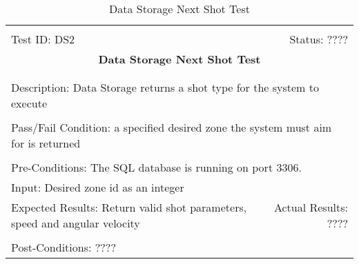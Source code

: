\documentclass[11pt]{article}
\begin{document}
\begin{center}
\begin{table}[H]
\begin{tabular}{|l r|}\hline&\\[-2mm]
	Test ID: DS2	&Status: ????\\[-3mm]
	\multicolumn{2}{|c|}{\textbf{\large{Data Storage Next Shot Test}}}\\&\\\hline&\\[-3mm]
	\multicolumn{2}{|p{\textwidth}|}{Description: Data Storage returns a shot type for the system to execute}\\[1mm]\hline&\\[-3mm]
	\multicolumn{2}{|p{\textwidth}|}{Pass/Fail Condition: a specified desired zone the system must aim for is returned}\\[1mm]\hline&\\[-3mm]
	\multicolumn{2}{|p{\textwidth}|}{Pre-Conditions: The SQL database is running on port 3306.}\\[4mm]
	\multicolumn{2}{|p{\textwidth}|}{Input: Desired zone id as an integer}\\[2mm]\hline
	\multicolumn{1}{|p{0.49\textwidth}}{Expected Results: Return valid shot parameters, speed and angular velocity}	&\multicolumn{1}{|p{0.45\textwidth}|}{Actual Results: ????}\\\hline&\\[-3mm]
	\multicolumn{2}{|p{\textwidth}|}{Post-Conditions: ????}\\\hline
\end{tabular}
\caption{Data Storage Next Shot Test}
\end{table}
\end{center}
\end{document}
